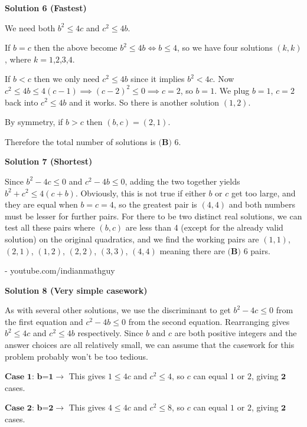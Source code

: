 \begin{enumerate}
 



\textbf{Solution 6 (Fastest)}

We need both $b^2\leq 4c$ and $c^2\leq 4b$. 

 If $b=c$ then the above become $b^2\leq 4b\iff b\leq 4$, so we have four solutions $(k,k)$, where $k=1$,$2$,$3$,$4$.

 If $b<c$ then we only need $c^2\leq 4b$ since it implies $b^2< 4c$. Now$c^2\leq 4b\leq 4(c-1) \implies (c-2)^2\leq 0 \implies c=2$, so $b=1$. We plug $b=1$, $c=2$ back into $c^2\leq 4b$ and it works. So there is another solution $(1,2)$.

 By symmetry, if $b>c$ then $(b,c)=(2,1)$.

 Therefore the total number of solutions is $\boxed{\textbf{(B) } 6}$.

 



\textbf{Solution 7 (Shortest)}

Since $b^{2} - 4c \le 0$ and $c^{2} - 4b \le 0$, adding the two together yields $b^{2} + c^{2} \le 4(c+b)$. Obviously, this is not true if either $b$ or $c$ get too large, and they are equal when $b = c = 4$, so the greatest pair is $(4,4)$ and both numbers must be lesser for further pairs. For there to be two distinct real solutions, we can test all these pairs where $(b,c)$ are less than 4 (except for the already valid solution) on the original quadratics, and we find the working pairs are $(1,1)$, $(2,1)$, $(1,2)$, $(2,2)$, $(3,3)$, $(4,4)$ meaning there are $\boxed{\textbf{(B) } 6}$ pairs.

 - youtube.com/indianmathguy

 



\textbf{Solution 8 (Very simple casework)}

As with several other solutions, we use the discriminant to get $b^2 -4c \leq0$ from the first equation and $c^2 -4b \leq 0$ from the second equation. Rearranging gives $b^2\leq 4c$ and $c^2\leq 4b$ respectively. Since $b$ and $c$ are both positive integers and the answer choices are all relatively small, we can assume that the casework for this problem probably won't be too tedious.

 $\textbf{Case 1: b=1}$$\to$ This gives $1\leq 4c$ and $c^2\leq 4$, so $c$ can equal $1$ or $2$, giving $\textbf{2}$ cases. 

 $\textbf{Case 2: b=2}$$\to$ This gives $4\leq 4c$ and $c^2\leq 8$, so $c$ can equal $1$ or $2$, giving $\textbf{2}$ cases.


\end{enumerate}
